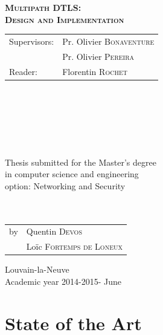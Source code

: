 \documentclass[11pt,a4paper,oldfontcommands]{memoir}
\renewcommand\title{Multipath DTLS:\\\vspace{0.5cm} Design and Implementation}
\newcommand\options{Networking and Security}
\newcommand\supervisor{Pr. Olivier \textsc{Bonaventure}}
\newcommand\supervisortwo{Pr. Olivier \textsc{Pereira}}
\newcommand\reader{Florentin \textsc{Rochet}}
\newcommand\years{2014-2015}
\begin{document}
\vspace{4.5cm}
\begin{center}
\bfseries{\scshape{\Huge{\title}}}
\end{center}
\vspace{4.5cm}
\begin{minipage}{.5\textwidth}
\begin{tabular}{ll}
Supervisors: & \supervisor
\\ & \supervisortwo 
\\ Reader:  & \reader 
\end{tabular} 
\\~\\~\\~\\~
\end{minipage}
\begin{minipage}{.5\textwidth}
Thesis submitted for the Master's degree
\\ in computer science and engineering
\\ option: \options
\\~\\~
\begin{tabular}{ll}
by & Quentin \textsc{Devos} \\
& Loïc \textsc{Fortemps de Loneux}
\end{tabular}
\end{minipage}
\vfill
\begin{center}
Louvain-la-Neuve
\\ Academic year \years - June
\end{center}


\cleardoublepage
\tableofcontents*
\cleardoublepage

\listoffigures*
\cleardoublepage

\lstlistoflistings*
\cleardoublepage




\markboth{}{}
\part{State of the Art}
\end{document}
